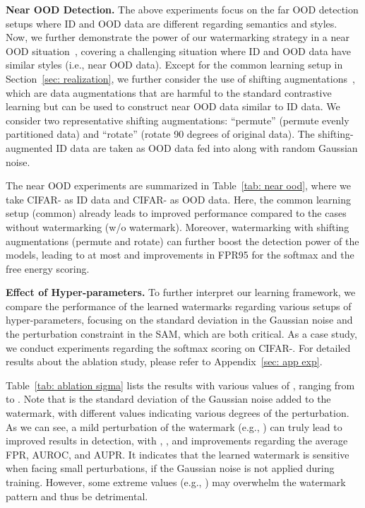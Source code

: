 \documentclass{article}
\begin{document}
\textbf{Near OOD Detection.} The above experiments focus on the far OOD detection setups where ID and OOD data are different regarding semantics and styles. Now, we further demonstrate the power of our watermarking strategy in a near OOD situation~\cite{winkens2020contrastive}, covering a challenging situation where ID and OOD data have similar styles (i.e., near OOD data). Except for the common learning setup in Section~\ref{sec: realization}, we further consider the use of shifting augmentations~\cite{tack2020csi}, which are data augmentations that are harmful to the standard contrastive learning but can be used to construct near OOD data similar to ID data. We consider two representative shifting augmentations: ``permute'' (permute evenly partitioned data) and ``rotate'' (rotate 90 degrees of original data). The shifting-augmented ID data are taken as OOD data fed into   along with random Gaussian noise. 

The near OOD experiments are summarized in Table~\ref{tab: near ood}, where we take CIFAR- as ID data and CIFAR- as OOD data. Here, the common learning setup (common) already leads to improved performance compared to the cases without watermarking (w/o watermark). Moreover, watermarking with shifting augmentations (permute and rotate) can further boost the detection power of the models, leading to at most  and  improvements in FPR95 for the softmax and the free energy scoring.








{\textbf{Effect of Hyper-parameters.}} To further interpret our learning framework, we compare the performance of the learned watermarks regarding various setups of hyper-parameters, focusing on the standard deviation  in the Gaussian noise and the perturbation constraint  in the SAM, which are both critical. As a case study, we conduct experiments regarding the softmax scoring on CIFAR-. For detailed results about the ablation study, please refer to Appendix~\ref{sec: app exp}.   



Table~\ref{tab: ablation sigma} lists the results with various values of , ranging from  to . Note that  is the standard deviation of the Gaussian noise added to the watermark, with different values indicating various degrees of the perturbation. As we can see, a mild perturbation of the watermark (e.g., ) can truly lead to improved results in detection, with , , and  improvements regarding the average FPR, AUROC, and AUPR. It indicates that the learned watermark is sensitive when facing small perturbations, if the Gaussian noise is not applied during training. However, some extreme values (e.g., ) may overwhelm the watermark pattern and thus be detrimental. 
\end{document}
